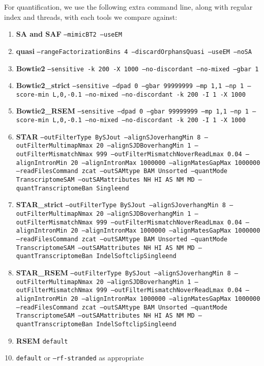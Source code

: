 For quantification, we use the following extra command line, along with regular
index and threads, with each tools we compare against:
\raggedright
\begin{enumerate}
	\item \textbf{SA and SAF} \texttt{--mimicBT2 --useEM}
	\item \textbf{quasi} \texttt{--rangeFactorizationBins 4 --discardOrphansQuasi --useEM --noSA}
	\item \textbf{Bowtie2} \texttt{--sensitive -k 200 -X 1000 --no-discordant --no-mixed --gbar 1}
	\item \textbf{Bowtie2\_strict} \texttt{--sensitive --dpad 0 --gbar 99999999 --mp 1,1
	  --np 1 --score-min L,0,-0.1 --no-mixed --no-discordant -k 200 -I 1 -X 1000}
	\item \textbf{Bowtie2\_RSEM} \texttt{--sensitive --dpad 0 --gbar 99999999 --mp 1,1
	  --np 1 --score-min L,0,-0.1 --no-mixed --no-discordant -k 200 -I 1 -X 1000}
	\item \textbf{STAR} \texttt{--outFilterType BySJout --alignSJoverhangMin 8 
	--outFilterMultimapNmax 20 --alignSJDBoverhangMin 1 --outFilterMismatchNmax 999
	--outFilterMismatchNoverReadLmax 0.04 --alignIntronMin 20 --alignIntronMax 1000000 
	--alignMatesGapMax 1000000 --readFilesCommand zcat --outSAMtype BAM Unsorted 
	--quantMode TranscriptomeSAM --outSAMattributes NH HI AS NM MD 
	--quantTranscriptomeBan Singleend}
	\item \textbf{STAR\_strict} \texttt{--outFilterType BySJout --alignSJoverhangMin 8 
	--outFilterMultimapNmax 20 --alignSJDBoverhangMin 1 --outFilterMismatchNmax 999
	--outFilterMismatchNoverReadLmax 0.04 --alignIntronMin 20 --alignIntronMax 1000000 
	--alignMatesGapMax 1000000 --readFilesCommand zcat --outSAMtype BAM Unsorted 
	--quantMode TranscriptomeSAM --outSAMattributes NH HI AS NM MD
	--quantTranscriptomeBan IndelSoftclipSingleend}
	\item \textbf{STAR\_RSEM} \texttt{--outFilterType BySJout --alignSJoverhangMin 8 
	--outFilterMultimapNmax 20 --alignSJDBoverhangMin 1 --outFilterMismatchNmax 999
	--outFilterMismatchNoverReadLmax 0.04 --alignIntronMin 20 --alignIntronMax 1000000 
	--alignMatesGapMax 1000000 --readFilesCommand zcat --outSAMtype BAM Unsorted 
	--quantMode TranscriptomeSAM --outSAMattributes NH HI AS NM MD
	--quantTranscriptomeBan IndelSoftclipSingleend}
	\item \textbf{RSEM} \texttt{default}
	\item \textbf{\kallisto} \texttt{default} or \texttt{--rf-stranded} as appropriate
\end{enumerate}

